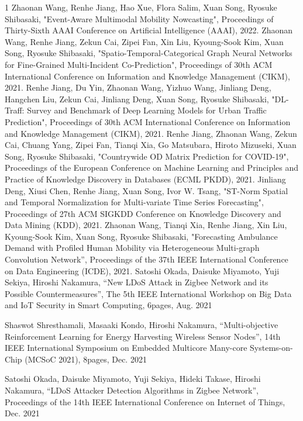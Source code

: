 \begin{査読付}{1}
Zhaonan Wang, Renhe Jiang, Hao Xue, Flora Salim, Xuan Song, Ryosuke Shibasaki, "Event-Aware Multimodal Mobility Nowcasting", Proceedings of Thirty-Sixth AAAI Conference on Artificial Intelligence (AAAI), 2022.
Zhaonan Wang, Renhe Jiang, Zekun Cai, Zipei Fan, Xin Liu, Kyoung-Sook Kim, Xuan Song, Ryosuke Shibasaki, "Spatio-Temporal-Categorical Graph Neural Networks for Fine-Grained Multi-Incident Co-Prediction", Proceedings of 30th ACM International Conference on Information and Knowledge Management (CIKM), 2021.
Renhe Jiang, Du Yin, Zhaonan Wang, Yizhuo Wang, Jinliang Deng, Hangchen Liu, Zekun Cai, Jinliang Deng, Xuan Song, Ryosuke Shibasaki, "DL-Traff: Survey and Benchmark of Deep Learning Models for Urban Traffic Prediction", Proceedings of 30th ACM International Conference on Information and Knowledge Management (CIKM), 2021.
Renhe Jiang, Zhaonan Wang, Zekun Cai, Chuang Yang, Zipei Fan, Tianqi Xia, Go Matsubara, Hiroto Mizuseki, Xuan Song, Ryosuke Shibasaki, "Countrywide OD Matrix Prediction for COVID-19", Proceedings of the European Conference on Machine Learning and Principles and Practice of Knowledge Discovery in Databases (ECML PKDD), 2021. 
Jinliang Deng, Xiusi Chen, Renhe Jiang, Xuan Song, Ivor W. Tsang, "ST-Norm Spatial and Temporal Normalization for Multi-variate Time Series Forecasting", Proceedings of 27th ACM SIGKDD Conference on Knowledge Discovery and Data Mining (KDD), 2021.
Zhaonan Wang, Tianqi Xia, Renhe Jiang, Xin Liu, Kyoung-Sook Kim, Xuan Song, Ryosuke Shibasaki, "Forecasting Ambulance Demand with Profiled Human Mobility via Heterogeneous Multi-graph Convolution Network”, Proceedings of the 37th IEEE International Conference on Data Engineering (ICDE), 2021. 
Satoshi Okada, Daisuke Miyamoto, Yuji Sekiya, Hiroshi Nakamura, ``New
LDoS Attack in Zigbee Network and its Possible Countermeasures'', The
5th IEEE International Workshop on Big Data and IoT Security in Smart
Computing, 6pages, Aug.  2021

Shaswot Shresthamali, Masaaki Kondo, Hiroshi Nakamura, ``Multi-objective
Reinforcement Learning for Energy Harvesting Wireless Sensor Nodes'',
14th IEEE International Symposium on Embedded Multicore Many-core
Systems-on-Chip (MCSoC 2021), 8pages, Dec. 2021

Satoshi Okada, Daisuke Miyamoto, Yuji Sekiya, Hideki Takase, Hiroshi
Nakamura, ``LDoS Attacker Detection Algorithms in Zigbee Network'',
Proceedings of the 14th IEEE International Conference on Internet of
Things, Dec. 2021


\end{査読付}
